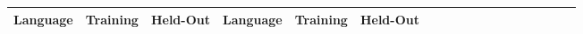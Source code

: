\documentclass[11pt,letterpaper]{article}
\begin{document}
\begin{center}
\begin{longtable}{l|ll||l|llllllllllllll}
	Language & Training & Held-Out & 	Language & Training & Held-Out\\ \hline

\end{longtable}
	\label{tab:corpora}
\end{center}



%
%
%
%
%
%
%
%
%
\end{document}
